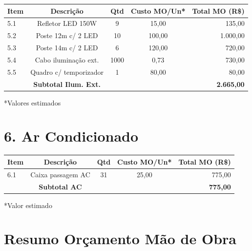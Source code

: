 \documentclass[12pt,a4paper]{article}
\renewenvironment{table}%
{\begin{center}%
\scriptsize%
\addtolength{\tabcolsep}{-2pt}%
}%
{\end{center}}
\begin{document}
\begin{table}
\centering
\begin{tabular}{lcccr}
\toprule
\textbf{Item} & \textbf{Descrição} & \textbf{Qtd} & \textbf{Custo MO/Un*} & \textbf{Total MO (R\$)} \\
\midrule
5.1 & Refletor LED 150W & 9 & 15,00 & 135,00 \\
5.2 & Poste 12m c/ 2 LED & 10 & 100,00 & 1.000,00 \\
5.3 & Poste 14m c/ 2 LED & 6 & 120,00 & 720,00 \\
5.4 & Cabo iluminação ext. & 1000 & 0,73 & 730,00 \\
5.5 & Quadro c/ temporizador & 1 & 80,00 & 80,00 \\
\midrule
 & \textbf{Subtotal Ilum. Ext.} & & & \textbf{2.665,00} \\
\bottomrule
\end{tabular}
\end{table}

\noindent\small{*Valores estimados}

\section{6. Ar Condicionado}

\begin{table}
\centering
\begin{tabular}{lcccr}
\toprule
\textbf{Item} & \textbf{Descrição} & \textbf{Qtd} & \textbf{Custo MO/Un*} & \textbf{Total MO (R\$)} \\
\midrule
6.1 & Caixa passagem AC & 31 & 25,00 & 775,00 \\
\midrule
 & \textbf{Subtotal AC} & & & \textbf{775,00} \\
\bottomrule
\end{tabular}
\end{table}

\noindent\small{*Valor estimado}

\pagebreak

\section{Resumo Orçamento Mão de Obra}
\end{document}
